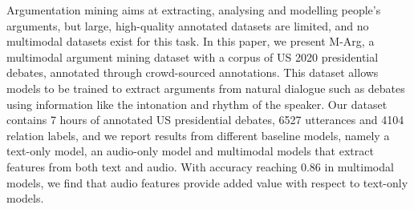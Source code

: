 Argumentation mining aims at extracting, analysing and modelling people's arguments, but large, high-quality annotated datasets are limited, and no multimodal datasets exist for this task. In this paper, we present M-Arg, a multimodal argument mining dataset with a corpus of US 2020 presidential debates, annotated through crowd-sourced annotations. This dataset allows models to be trained to extract arguments from natural dialogue such as debates using information like the intonation and rhythm of the speaker. Our dataset contains 7 hours of annotated US presidential debates, 6527 utterances and 4104 relation labels, and we report results from different baseline models, namely a text-only model, an audio-only model and multimodal models that  extract features from both text and audio. With accuracy reaching 0.86 in multimodal models, we find that  audio features provide added value with respect to text-only models.
